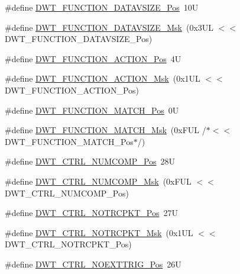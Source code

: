 \begin{DoxyCompactItemize}
\#define \mbox{\hyperlink{group___c_m_s_i_s___d_w_t_ga0517a186d4d448aa6416440f40fe7a4d}{D\+W\+T\+\_\+\+F\+U\+N\+C\+T\+I\+O\+N\+\_\+\+D\+A\+T\+A\+V\+S\+I\+Z\+E\+\_\+\+Pos}}~10U
\item 
\#define \mbox{\hyperlink{group___c_m_s_i_s___d_w_t_gaab42cbc1e6084c44d5de70971613ea76}{D\+W\+T\+\_\+\+F\+U\+N\+C\+T\+I\+O\+N\+\_\+\+D\+A\+T\+A\+V\+S\+I\+Z\+E\+\_\+\+Msk}}~(0x3\+U\+L $<$$<$ D\+W\+T\+\_\+\+F\+U\+N\+C\+T\+I\+O\+N\+\_\+\+D\+A\+T\+A\+V\+S\+I\+Z\+E\+\_\+\+Pos)
\item 
\#define \mbox{\hyperlink{group___c_m_s_i_s___d_w_t_ga00893dd43b824ca5be80e0235a237485}{D\+W\+T\+\_\+\+F\+U\+N\+C\+T\+I\+O\+N\+\_\+\+A\+C\+T\+I\+O\+N\+\_\+\+Pos}}~4U
\item 
\#define \mbox{\hyperlink{group___c_m_s_i_s___d_w_t_ga4d104412bbadbbfbde1c6da0f9b0fc3e}{D\+W\+T\+\_\+\+F\+U\+N\+C\+T\+I\+O\+N\+\_\+\+A\+C\+T\+I\+O\+N\+\_\+\+Msk}}~(0x1\+U\+L $<$$<$ D\+W\+T\+\_\+\+F\+U\+N\+C\+T\+I\+O\+N\+\_\+\+A\+C\+T\+I\+O\+N\+\_\+\+Pos)
\item 
\#define \mbox{\hyperlink{group___c_m_s_i_s___d_w_t_ga4108994a9eb6b2cd8d8289b1b7824fe5}{D\+W\+T\+\_\+\+F\+U\+N\+C\+T\+I\+O\+N\+\_\+\+M\+A\+T\+C\+H\+\_\+\+Pos}}~0U
\item 
\#define \mbox{\hyperlink{group___c_m_s_i_s___d_w_t_gac2fb3e387e405a4b33fc5ba0bea5b21c}{D\+W\+T\+\_\+\+F\+U\+N\+C\+T\+I\+O\+N\+\_\+\+M\+A\+T\+C\+H\+\_\+\+Msk}}~(0x\+F\+U\+L /$\ast$$<$$<$ D\+W\+T\+\_\+\+F\+U\+N\+C\+T\+I\+O\+N\+\_\+\+M\+A\+T\+C\+H\+\_\+\+Pos$\ast$/)
\item 
\#define \mbox{\hyperlink{group___c_m_s_i_s___d_w_t_gaac44b9b7d5391a7ffef129b7f6c84cd7}{D\+W\+T\+\_\+\+C\+T\+R\+L\+\_\+\+N\+U\+M\+C\+O\+M\+P\+\_\+\+Pos}}~28U
\item 
\#define \mbox{\hyperlink{group___c_m_s_i_s___d_w_t_gaa3d37d68c2ba73f2026265584c2815e7}{D\+W\+T\+\_\+\+C\+T\+R\+L\+\_\+\+N\+U\+M\+C\+O\+M\+P\+\_\+\+Msk}}~(0x\+F\+U\+L $<$$<$ D\+W\+T\+\_\+\+C\+T\+R\+L\+\_\+\+N\+U\+M\+C\+O\+M\+P\+\_\+\+Pos)
\item 
\#define \mbox{\hyperlink{group___c_m_s_i_s___d_w_t_gaa82840323a2628e7f4a2b09b74fa73fd}{D\+W\+T\+\_\+\+C\+T\+R\+L\+\_\+\+N\+O\+T\+R\+C\+P\+K\+T\+\_\+\+Pos}}~27U
\item 
\#define \mbox{\hyperlink{group___c_m_s_i_s___d_w_t_ga04d8bb0a065ca38e2e5f13a97e1f7073}{D\+W\+T\+\_\+\+C\+T\+R\+L\+\_\+\+N\+O\+T\+R\+C\+P\+K\+T\+\_\+\+Msk}}~(0x1\+U\+L $<$$<$ D\+W\+T\+\_\+\+C\+T\+R\+L\+\_\+\+N\+O\+T\+R\+C\+P\+K\+T\+\_\+\+Pos)
\item 
\#define \mbox{\hyperlink{group___c_m_s_i_s___d_w_t_gad997b9026715d5609b5a3b144eca42d0}{D\+W\+T\+\_\+\+C\+T\+R\+L\+\_\+\+N\+O\+E\+X\+T\+T\+R\+I\+G\+\_\+\+Pos}}~26U

\end{DoxyCompactItemize}
